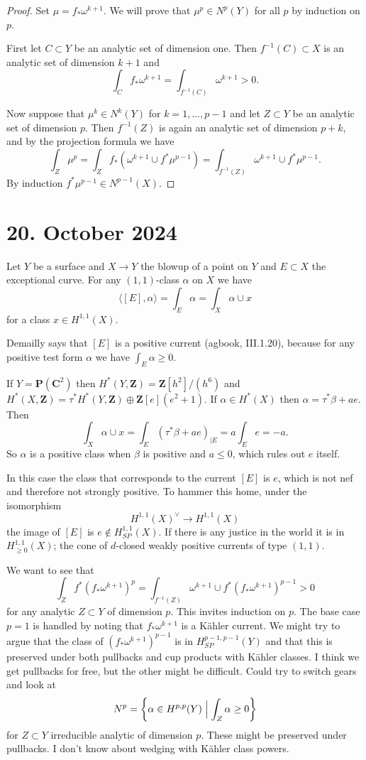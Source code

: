 \documentclass[11pt]{amsart}
\theoremstyle{definition}
\def\ZZ{\mathbf{Z}}
\def\CC{\mathbf{C}}
\def\PP{\mathbf{P}}
\def\<{\langle}
\def\>{\rangle}
\begin{document}
\begin{proof}
Set $\mu = f_*\omega^{k+1}$.
We will prove that $\mu^p \in N^p(Y)$ for all $p$ by induction on $p$.

First let $C \subset Y$ be an analytic set of dimension one.
Then $f^{-1}(C) \subset X$ is an analytic set of dimension $k+1$ and
\[
\int_C f_*\omega^{k+1}
= \int_{f^{-1}(C)} \omega^{k+1} > 0.
\]

Now suppose that $\mu^k \in N^k(Y)$ for $k = 1, \ldots, p-1$ and let $Z \subset Y$ be an analytic set of dimension $p$.
Then $f^{-1}(Z)$ is again an analytic set of dimension $p+k$, and by the projection formula we have
\[
\int_Z \mu^p
= \int_Z f_*(\omega^{k+1} \cup f^*\mu^{p-1})
= \int_{f^{-1}(Z)} \omega^{k+1} \cup f^*\mu^{p-1}.
\]
By induction $f^*\mu^{p-1} \in N^{p-1}(X)$.
\end{proof}


\section{20. October 2024}

Let $Y$ be a surface and $X \to Y$ the blowup of a point on $Y$ and $E \subset X$ the exceptional curve.
For any $(1,1)$-class $\alpha$ on $X$ we have
\[
\< [E], \alpha \>
= \int_E \alpha
= \int_X \alpha \cup x
\]
for a class $x \in H^{1,1}(X)$.

Demailly says that $[E]$ is a positive current (agbook, III.1.20), because for any positive test form $\alpha$ we have $\int_E \alpha \geq 0$.

If $Y = \PP(\CC^2)$ then $H^*(Y,\ZZ) = \ZZ[h^2]/(h^6)$ and $H^*(X,\ZZ) = \tau^*H^*(Y,\ZZ) \oplus \ZZ[e](e^2+1)$.
If $\alpha \in H^*(X)$ then $\alpha = \tau^*\beta + a e$.
Then
\[
\int_X \alpha \cup x
= \int_E (\tau^*\beta + ae)_{|E}
= a \int_E e
= -a.
\]
So $\alpha$ is a positive class when $\beta$ is positive and $a \leq 0$, which rules out $e$ itself.

In this case the class that corresponds to the current $[E]$ is $e$, which is not nef and therefore not strongly positive.
To hammer this home, under the isomorphism
\[
H^{1,1}(X)^\vee \longrightarrow H^{1,1}(X)
\]
the image of $[E]$ is $e \not\in H^{1,1}_{SP}(X)$.
If there is any justice in the world it is in $H^{1,1}_{\geq0}(X)$; the cone of $d$-closed weakly positive currents of type $(1,1)$.

We want to see that
\[
\int_Z f^*(f_*\omega^{k+1})^{p} 
= \int_{f^{-1}(Z)} \omega^{k+1} \cup f^*(f_*\omega^{k+1})^{p-1} 
> 0
\]
for any analytic $Z \subset Y$ of dimension $p$.
This invites induction on $p$.
The base case $p = 1$ is handled by noting that $f_*\omega^{k+1}$ is a K\"ahler current.
We might try to argue that the class of $(f_*\omega^{k+1})^{p-1}$ is in $H^{p-1,p-1}_{SP}(Y)$ and that this is preserved under both pullbacks and cup products with K\"ahler classes.
I think we get pullbacks for free, but the other might be difficult.
Could try to switch gears and look at
\[
N^{p} = \biggl\{ \alpha \in H^{p,p}(Y) \Bigm| \int_Z \alpha \geq 0 \biggr\}
\]
for $Z \subset Y$ irreducible analytic of dimension $p$.
These might be preserved under pullbacks.
I don't know about wedging with K\"ahler class powers.
\end{document}
